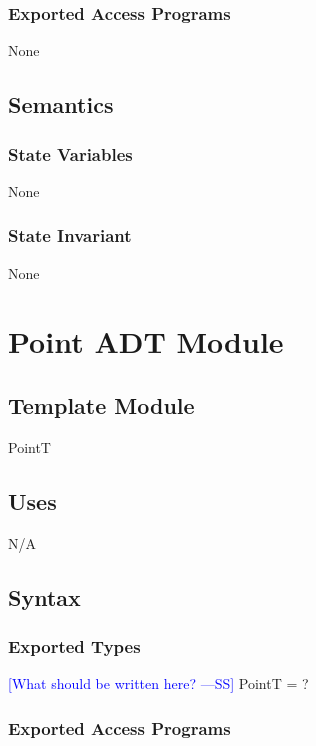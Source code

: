 \documentclass[12pt]{article}
\newcommand{\authornote}[3]{\textcolor{#1}{[#3 ---#2]}}
\newcommand{\authornote}[3]{}
\newcommand{\wss}[1]{\authornote{blue}{SS}{#1}}
\begin{document}
\subsubsection* {Exported Access Programs}

None

\subsection* {Semantics}

\subsubsection* {State Variables}

None

\subsubsection* {State Invariant}

None

\newpage

\section* {Point ADT Module}

\subsection*{Template Module}

PointT

\subsection* {Uses}

N/A

\subsection* {Syntax}

\subsubsection* {Exported Types}

\wss{What should be written here?}
PointT = ?

\subsubsection* {Exported Access Programs}
\end{document}
